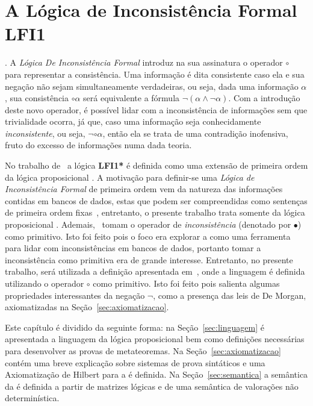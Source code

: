 \chapter{A Lógica de Inconsistência Formal LFI1}
\label{cap:LFI1}

. A \textit{Lógica De Inconsistência Formal} \lfium{} introduz na sua assinatura o operador $\circ$ para representar a consistência. Uma informação é dita consistente caso ela e sua negação não sejam simultaneamente verdadeiras, ou seja, dada uma informação $\alpha$, sua consistência $\circ \alpha$ será equivalente a fórmula $\neg (\alpha \land \neg \alpha)$. Com a introdução deste novo operador, é possível lidar com a inconsistência de informações sem que trivialidade ocorra, já que, caso uma informação seja conhecidamente \textit{inconsistente}, ou seja, $\neg \circ \alpha$, então ela se trata de uma contradição inofensiva, fruto do excesso de informações numa dada teoria.

No trabalho de~ a lógica \textbf{LFI1*} é definida como uma extensão de primeira ordem da lógica proposicional \lfium{}. A motivação para definir-se uma \textit{Lógica de Inconsistência Formal} de primeira ordem vem da natureza das informações contidas em bancos de dados, estas que podem ser compreendidas como sentenças de primeira ordem fixas~\cite{Codd}, entretanto, o presente trabalho trata somente da lógica proposicional \lfium{}. Ademais,~ tomam o operador de \textit{inconsistência} (denotado por $\bullet$) como primitivo. Isto foi feito pois o foco era explorar a \lfium{} como uma ferramenta para lidar com inconsistências em bancos de dados, portanto tomar a inconsistência como primitiva era de grande interesse. Entretanto, no presente trabalho, será utilizada a definição apresentada em~, onde a linguagem é definida utilizando o operador $\circ$ como primitivo. Isto foi feito pois salienta algumas propriedades interessantes da negação $\neg$, como a presença das leis de De Morgan, axiomatizadas na Seção~\ref{sec:axiomatizacao}.

Este capítulo é dividido da seguinte forma: na Seção~\ref{sec:linguagem} é apresentada a linguagem da lógica proposicional \lfium{} bem como definições necessárias para desenvolver as provas de metateoremas. Na Seção~\ref{sec:axiomatizacao} contém uma breve explicação sobre sistemas de prova sintáticos e uma Axiomatização de Hilbert para a \lfium{} é definida. Na Seção~\ref{sec:semantica} a semântica da \lfium{} é definida a partir de matrizes lógicas e de uma semântica de valorações não determinística.


